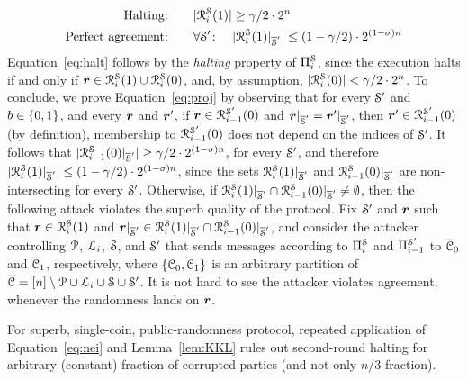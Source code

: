 \begin{align}
\text{Halting:}&\qquad |\mathcal{R}_{i }^{\mathcal{S}}(1)|\ge \gamma/2 \cdot 2^{n} \label{eq:halt} \\
\text{Perfect agreement:}&\qquad \forall \mathcal{S}' \colon \quad |\mathcal{R}_{i}^{\mathcal{S}}(1)|_{\overline{\mathcal{S}}'}|\le (1-\gamma/2)\cdot 2^{(1-\sigma) n} \label{eq:proj}
\end{align}
\noindent
Equation~\ref{eq:halt} follows by the \emph{halting} property of $\Pi_{i}^{\mathcal{S}}$, since the execution halts if and only if ${ \boldsymbol{r}}\in \mathcal{R}_{i }^{\mathcal{S}}(1)\cup \mathcal{R}_{i }^{\mathcal{S}}(0)$, and, by assumption, $|\mathcal{R}_{i }^{\mathcal{S}}(0)|< \gamma/2 \cdot 2^{n}$.
To conclude, we prove Equation~\ref{eq:proj} by observing that for every $\mathcal{S}'$ and $b\in \{0,1\}$, and every ${ \boldsymbol{r}}$ and ${ \boldsymbol{r}}'$, if ${ \boldsymbol{r}}\in \mathcal{R}_{i-1}^{\mathcal{S}'}(0)$ and ${ \boldsymbol{r}}|_{\overline{\mathcal{S}}'}={ \boldsymbol{r}}'|_{\overline{\mathcal{S}}'}$, then ${ \boldsymbol{r}}'\in \mathcal{R}_{i-1}^{\mathcal{S}'}(0)$ (by definition), \ie membership to $\mathcal{R}_{i-1}^{\mathcal{S}'}(0)$ does not depend on the indices of $\mathcal{S}'$.
It follows that $|\mathcal{R}_{i-1}^{\mathcal{S}}(0)|_{\overline{\mathcal{S}}'}|\ge \gamma/2 \cdot 2^{(1-\sigma) n}$, for every $\mathcal{S}'$, and therefore $|\mathcal{R}_{i}^{\mathcal{S}}(1)|_{\overline{\mathcal{S}}'}|\le (1-\gamma/2)\cdot 2^{(1-\sigma) n}$, since the sets $\mathcal{R}_{i}^{\mathcal{S}}(1)|_{\overline{\mathcal{S}}'}$ and $\mathcal{R}_{i-1}^{\mathcal{S}}(0)|_{\overline{\mathcal{S}}'}$ are non-intersecting for every $\mathcal{S}'$.
Otherwise, if $\mathcal{R}_{i}^{\mathcal{S}}(1)|_{\overline{\mathcal{S}}'}\cap \mathcal{R}_{i-1}^{\mathcal{S}}(0)|_{\overline{\mathcal{S}}'}\neq \emptyset$, then the following attack violates the superb quality of the protocol. Fix $\mathcal{S}'$ and ${ \boldsymbol{r}}$ such that ${ \boldsymbol{r}}\in \mathcal{R}_{i}^{\mathcal{S}}(1)$ and ${ \boldsymbol{r}}|_{\overline{\mathcal{S}}'}\in \mathcal{R}_{i}^{\mathcal{S}}(1)|_{\overline{\mathcal{S}}'}\cap \mathcal{R}_{i-1}^{\mathcal{S}}(0)|_{\overline{\mathcal{S}}'}$, and consider the attacker controlling $\mathcal{P}$, ${\cal{L}}_{i}$, $\mathcal{S}$, and $\mathcal{S}'$ that sends
messages according to $\Pi_{i}^{\mathcal{S}}$ and $\Pi_{i-1}^{\mathcal{S}'}$ to $\overline{\mathcal{C}}_0$ and $\overline{\mathcal{C}}_1$, respectively, where $\{\overline{\mathcal{C}}_0,\overline{\mathcal{C}}_1\}$ is an arbitrary partition of $\overline{\mathcal{C}}=[n]\setminus \mathcal{P}\cup {\cal{L}}_{i} \cup \mathcal{S}\cup \mathcal{S}'$. It is not hard to see the attacker violates agreement, whenever the randomness lands on ${ \boldsymbol{r}}$.



\begin{remark}
For superb, single-coin, public-randomness protocol, repeated application of Equation~\ref{eq:nei} and Lemma~\ref{lem:KKL} rules out second-round halting for arbitrary (constant) fraction of corrupted parties (and not only $n/3$ fraction).
\end{remark}

